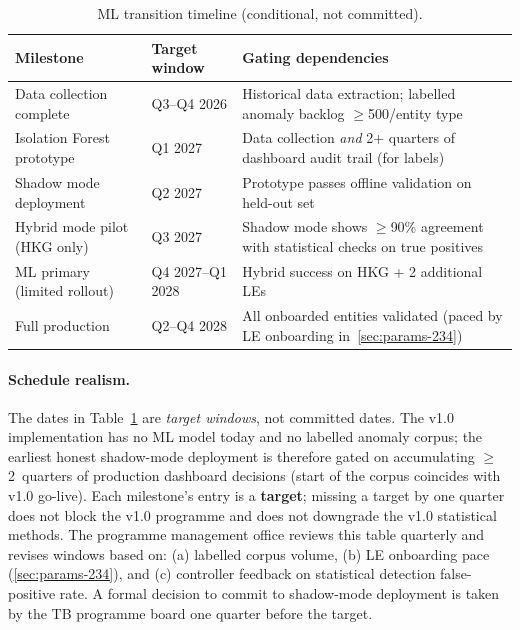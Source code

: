 \begin{table}[htbp]
\centering
\caption{ML transition timeline (conditional, not committed).}
\label{tab:ml-timeline}
\footnotesize
\begin{tabularx}{\linewidth}{@{}l l X@{}}
\toprule
\textbf{Milestone} & \textbf{Target window} & \textbf{Gating dependencies} \\ \midrule
Data collection complete & Q3--Q4 2026 & Historical data extraction; labelled anomaly backlog $\ge$500/entity type \\
Isolation Forest prototype & Q1 2027 & Data collection \emph{and} 2+ quarters of dashboard audit trail (for labels) \\
Shadow mode deployment & Q2 2027 & Prototype passes offline validation on held-out set \\
Hybrid mode pilot (HKG only) & Q3 2027 & Shadow mode shows $\ge$90\% agreement with statistical checks on true positives \\
ML primary (limited rollout) & Q4 2027--Q1 2028 & Hybrid success on HKG + 2 additional LEs \\
Full production & Q2--Q4 2028 & All onboarded entities validated (paced by LE onboarding in~\cref{sec:params-234}) \\
\bottomrule
\end{tabularx}
\end{table}

\paragraph{Schedule realism.}
The dates in Table~\ref{tab:ml-timeline} are \emph{target windows},
not committed dates. The v1.0 implementation has no ML model today
and no labelled anomaly corpus; the earliest honest shadow-mode
deployment is therefore gated on accumulating $\ge$2~quarters of
production dashboard decisions (start of the corpus coincides with
v1.0 go-live). Each milestone's entry is a \textbf{target}; missing
a target by one quarter does not block the v1.0 programme and does
not downgrade the v1.0 statistical methods. The programme
management office reviews this table quarterly and revises windows
based on: (a) labelled corpus volume, (b) LE onboarding pace
(\cref{sec:params-234}), and (c) controller feedback on
statistical detection false-positive rate. A formal decision to
commit to shadow-mode deployment is taken by the TB programme
board one quarter before the target.